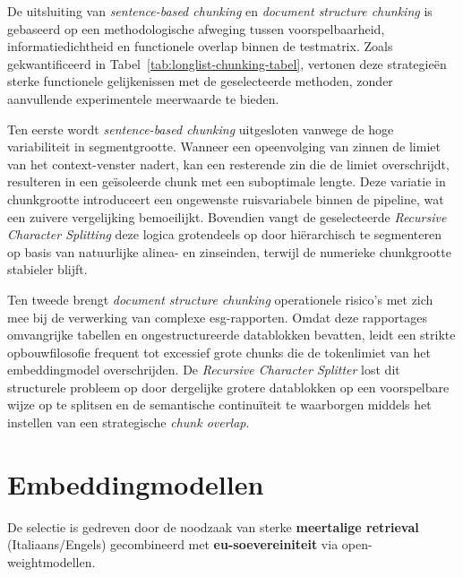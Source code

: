 De uitsluiting van \textit{sentence-based chunking} en \textit{document structure chunking} is gebaseerd op een methodologische afweging tussen voorspelbaarheid, informatiedichtheid en functionele overlap binnen de testmatrix. Zoals gekwantificeerd in Tabel~\ref{tab:longlist-chunking-tabel}, vertonen deze strategieën sterke functionele gelijkenissen met de geselecteerde methoden, zonder aanvullende experimentele meerwaarde te bieden.

Ten eerste wordt \textit{sentence-based chunking} uitgesloten vanwege de hoge variabiliteit in segmentgrootte. Wanneer een opeenvolging van zinnen de limiet van het context-venster nadert, kan een resterende zin die de limiet overschrijdt, resulteren in een geïsoleerde chunk met een suboptimale lengte. Deze variatie in chunkgrootte introduceert een ongewenste ruisvariabele binnen de pipeline, wat een zuivere vergelijking bemoeilijkt. Bovendien vangt de geselecteerde \textit{Recursive Character Splitting} deze logica grotendeels op door hiërarchisch te segmenteren op basis van natuurlijke alinea- en zinseinden, terwijl de numerieke chunkgrootte stabieler blijft.

Ten tweede brengt \textit{document structure chunking} operationele risico's met zich mee bij de verwerking van complexe \gls{esg}-rapporten. Omdat deze rapportages omvangrijke tabellen en ongestructureerde datablokken bevatten, leidt een strikte opbouwfilosofie frequent tot excessief grote chunks die de tokenlimiet van het embeddingmodel overschrijden. De \textit{Recursive Character Splitter} lost dit structurele probleem op door dergelijke grotere datablokken op een voorspelbare wijze op te splitsen en de semantische continuïteit te waarborgen middels het instellen van een strategische \textit{chunk overlap}.

\section{Embeddingmodellen}
\label{sec:shortlist-embedding}

De selectie is gedreven door de noodzaak van sterke \textbf{meertalige retrieval} (Italiaans/Engels) gecombineerd met \textbf{\gls{eu}-soevereiniteit} via open-weightmodellen.

